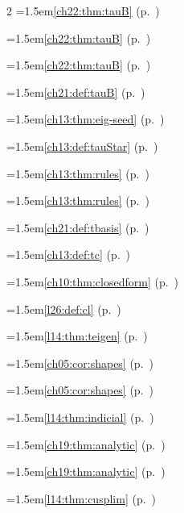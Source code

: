 \begin{multicols}{2}
\hangindent=1.5em\quad \ref{ch22:thm:tauB} (p.~\pageref{ch22:thm:tauB})\par
\hangindent=1.5em\quad \ref{ch22:thm:tauB} (p.~\pageref{ch22:thm:tauB})\par
\hangindent=1.5em\quad \ref{ch22:thm:tauB} (p.~\pageref{ch22:thm:tauB})\par
\hangindent=1.5em\quad \ref{ch21:def:tauB} (p.~\pageref{ch21:def:tauB})\par
\hangindent=1.5em\quad \ref{ch13:thm:eig-seed} (p.~\pageref{ch13:thm:eig-seed})\par
\hangindent=1.5em\quad \ref{ch13:def:tauStar} (p.~\pageref{ch13:def:tauStar})\par
\hangindent=1.5em\quad \ref{ch13:thm:rules} (p.~\pageref{ch13:thm:rules})\par
\hangindent=1.5em\quad \ref{ch13:thm:rules} (p.~\pageref{ch13:thm:rules})\par
\hangindent=1.5em\quad \ref{ch21:def:tbasis} (p.~\pageref{ch21:def:tbasis})\par
\hangindent=1.5em\quad \ref{ch13:def:tc} (p.~\pageref{ch13:def:tc})\par
\hangindent=1.5em\quad \ref{ch10:thm:closedform} (p.~\pageref{ch10:thm:closedform})\par
\hangindent=1.5em\quad \ref{l26:def:cl} (p.~\pageref{l26:def:cl})\par
\hangindent=1.5em\quad \ref{l14:thm:teigen} (p.~\pageref{l14:thm:teigen})\par
\hangindent=1.5em\quad \ref{ch05:cor:shapes} (p.~\pageref{ch05:cor:shapes})\par
\hangindent=1.5em\quad \ref{ch05:cor:shapes} (p.~\pageref{ch05:cor:shapes})\par
\hangindent=1.5em\quad \ref{l14:thm:indicial} (p.~\pageref{l14:thm:indicial})\par
\hangindent=1.5em\quad \ref{ch19:thm:analytic} (p.~\pageref{ch19:thm:analytic})\par
\hangindent=1.5em\quad \ref{ch19:thm:analytic} (p.~\pageref{ch19:thm:analytic})\par
\hangindent=1.5em\quad \ref{l14:thm:cusplim} (p.~\pageref{l14:thm:cusplim})\par

\end{multicols}
